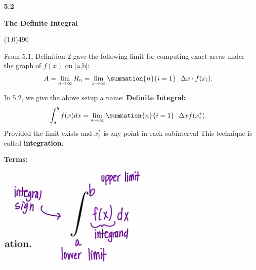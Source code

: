 \documentclass{report}
\begin{document}
\pagebreak \bigbreak \noindent
\pagebreak \bigbreak \noindent
\begin{Large}
  \begin{mdframed}
    \begin{center}
      \textbf{5.2}
    \end{center}
  \end{mdframed}
\end{Large}
\begin{Large}
  \begin{center}
    \textbf{The Definite Integral}
  \end{center}
\end{Large}
\line(1,0){490}

\bigbreak \noindent \bigbreak \noindent 
From 5.1, Definition 2 gave the following limit for computing exact areas under the graph of $f(x)$ on [a,b]:
\begin{align*}
  A = \lim\limits_{n \to \infty}{R_{n} = \lim\limits_{x \to \infty}{\summation{n}{i=1}\ \ \Delta x \cdot f(x_{i})}}
.\end{align*}

\bigbreak \noindent 
In 5.2, we give the above setup a name: \textbf{Definite Integral:}
\begin{align*}
  \int_{a}^{b}f(x)dx = \lim\limits_{n \to \infty}{\summation{n}{i=1}\ \ \Delta xf(x_{i}^{*})}
.\end{align*}
\bigbreak \noindent 
Provided the limit exists and $x_{i}^{*}$ is any point in each subinterval
\bigbreak \noindent 
This technique is called \textbf{integration}.
\bigbreak \noindent 
\bigbreak \noindent 
\begin{mdframed}
  \textbf{Terms:}
  \bigbreak \noindent 
  \begin{center}
    \includegraphics[scale=0.8]{./figures/8.png}
  \end{center}
\end{mdframed}

\bigbreak \noindent 
{}
\end{document}
